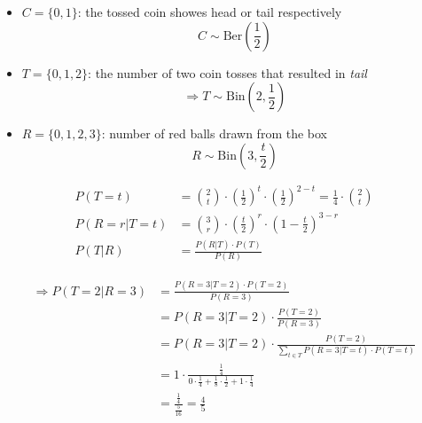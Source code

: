 \begin{itemize}
  \item{$C = \{0,1\}$: the tossed coin showes head or tail respectively}
\[ C \sim \mathrm{Ber}\left(\frac{1}{2}\right) \]
  \item{$T = \{0,1,2\}$: the number of two coin tosses that resulted in \emph{tail}
\[ \Rightarrow T \sim \mathrm{Bin}\left(2, \frac{1}{2}\right) \]}
  \item{$R = \{0,1,2,3\}$: number of red balls drawn from the box
\[ R \sim \mathrm{Bin}\left(3, \frac{t}{2}\right) \]
}
\end{itemize}

\begin{align*}
P(T=t) &= \binom{2}{t} \cdot \left(\frac{1}{2}\right)^t \cdot \left(\frac{1}{2}\right)^{2-t} = \frac{1}{4} \cdot \binom{2}{t} \\
P(R=r|T=t) &= \binom{3}{r} \cdot \left( \frac{t}{2} \right)^r \cdot \left(1 - \frac{t}{2}\right)^{3-r} \\
P(T|R) &= \frac{P(R|T) \cdot P(T)}{P(R)}
\end{align*}

\begin{align*}
\Rightarrow P(T=2|R=3) &= \frac{P(R=3|T=2) \cdot P(T=2)}{P(R=3)} \\
                       &= P(R=3|T=2) \cdot \frac{P(T=2)}{P(R=3)} \\
		       &= P(R=3|T=2) \cdot \frac{P(T=2)}{\sum\limits_{t \in T} P(R=3|T=t) \cdot P(T=t)} \\
		       &= 1 \cdot \frac{\frac{1}{4}}{0 \cdot \frac{1}{4} + \frac{1}{8} \cdot \frac{1}{2} + 1 \cdot \frac{1}{4}} \\
		       &= \frac{ \frac{1}{4} }{ \frac{5}{16} } = \frac{4}{5}
\end{align*}

